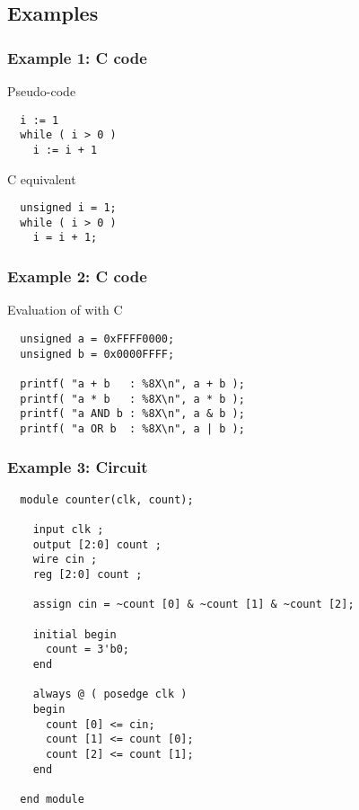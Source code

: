 \subsection{Examples}

\begin{frame}[fragile]
  \frametitle{Example 1: C code}

  Pseudo-code
  \begin{verbatim}
  i := 1
  while ( i > 0 )
    i := i + 1 
  \end{verbatim} 

  \vfill
  \pause

  C equivalent
  \begin{verbatim}
  unsigned i = 1;
  while ( i > 0 )
    i = i + 1; 
  \end{verbatim} 

\end{frame}

\begin{frame}[fragile]
  \frametitle{Example 2: C code}

  Evaluation of  with C
  \begin{verbatim}
  unsigned a = 0xFFFF0000;
  unsigned b = 0x0000FFFF;

  printf( "a + b   : %8X\n", a + b );
  printf( "a * b   : %8X\n", a * b );
  printf( "a AND b : %8X\n", a & b );
  printf( "a OR b  : %8X\n", a | b );
  \end{verbatim} 

\end{frame}

\begin{frame}[fragile]
  \frametitle{Example 3: Circuit}

  \scriptsize

  \begin{verbatim}
  module counter(clk, count); 

    input clk ;
    output [2:0] count ;
    wire cin ;
    reg [2:0] count ;

    assign cin = ~count [0] & ~count [1] & ~count [2];
  
    initial begin
      count = 3'b0;
    end
  
    always @ ( posedge clk )
    begin 
      count [0] <= cin; 
      count [1] <= count [0]; 
      count [2] <= count [1];
    end

  end module
  \end{verbatim}
  \vspace{-70pt}{\hspace{160pt}{\scalebox{.25}{}}}

\end{frame}
